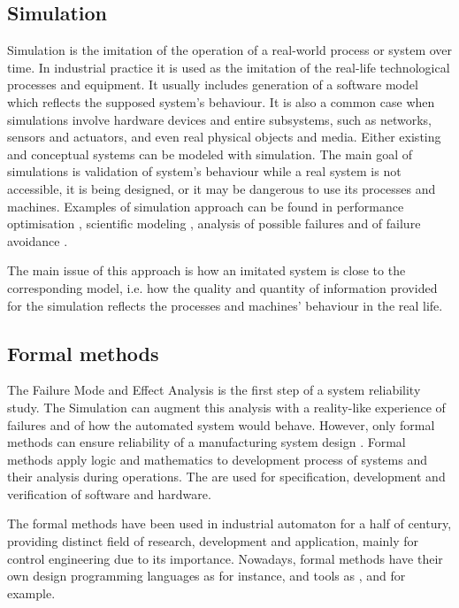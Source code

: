 \subsection{Simulation}

Simulation is the imitation of the operation of a real-world process or system
over time\cite{banks_introduction_1999}. In industrial practice it is used as
the imitation of the real-life technological processes and equipment. It usually
includes generation of a software model which reflects the supposed system's
behaviour. It is also a common case when simulations involve hardware devices
and entire subsystems, such as networks, sensors and actuators, and even real
physical objects and media. Either existing and conceptual systems can be
modeled with simulation. The main goal of simulations is validation of system's
behaviour while a real system is not accessible, it is being designed, or it may
be dangerous to use its processes and machines. Examples of simulation approach 
can be found in performance optimisation \cite{tamimi_simulation_2012},
scientific modeling \cite{sharda_best_2011}, analysis of possible failures
\cite{weatherford_simulation_2003} and of failure avoidance
\cite{warrington_modelling_2002}.

The main issue of this approach is how an imitated system is close to the
corresponding model, i.e. how the quality and quantity of information provided
for the simulation reflects the processes and machines' behaviour in the real
life.

\subsection{Formal methods}

The Failure Mode and Effect Analysis is the first step of a system reliability
study. The Simulation can augment this analysis with a reality-like experience
of failures and of how the automated system would behave. However, only formal
methods can ensure reliability of a manufacturing system design
\cite{holloway_why_1997}. Formal methods apply logic and mathematics to
development process of systems and their analysis during operations. The are
used for specification, development and verification of software and hardware.

The formal methods have been used in industrial automaton for a half of century,
providing distinct field of research, development and application, mainly
for control engineering due to its importance. Nowadays, formal methods have
their own design programming languages as  \cite{spivey_z_1992} for instance,
and tools as \cite{event_b_web}, \cite{atelier_b_web} and \cite{nusmv} for
example.

